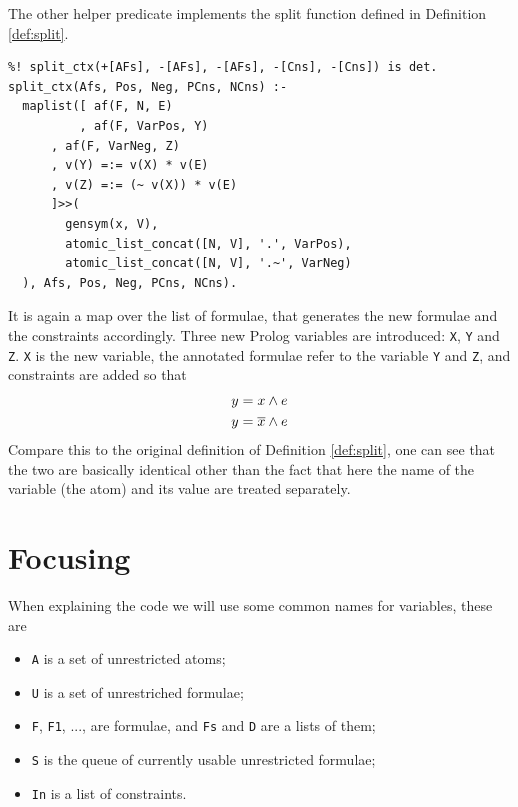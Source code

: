 \documentclass[a4paper, 12pt, tesi, english]{report}
\begin{document}
The other helper predicate implements the split function defined in Definition \ref{def:split}.
\begin{verbatim}
%! split_ctx(+[AFs], -[AFs], -[AFs], -[Cns], -[Cns]) is det.
split_ctx(Afs, Pos, Neg, PCns, NCns) :-
  maplist([ af(F, N, E)
          , af(F, VarPos, Y)
  	  , af(F, VarNeg, Z)
  	  , v(Y) =:= v(X) * v(E)
  	  , v(Z) =:= (~ v(X)) * v(E)
  	  ]>>(
  	    gensym(x, V),
  	    atomic_list_concat([N, V], '.', VarPos),
  	    atomic_list_concat([N, V], '.~', VarNeg)
  ), Afs, Pos, Neg, PCns, NCns).
\end{verbatim}
It is again a map over the list of formulae, that generates the new formulae and the constraints accordingly.
Three new Prolog variables are introduced: \texttt{X}, \texttt{Y} and \texttt{Z}.
\texttt{X} is the new variable, the annotated formulae refer to the variable \texttt{Y} and \texttt{Z}, and constraints are added so that
\begin{align*}
	y &= x \wedge e \\
	y &= \overline{x} \wedge e \\
\end{align*}
Compare this to the original definition of Definition \ref{def:split}, one can see that the two are basically identical other than the fact that here the name of the variable (the atom) and its value are treated separately.

\section{Focusing}
When explaining the code we will use some common names for variables, these are
\begin{itemize}
	\item \texttt{A} is a set of unrestricted atoms;
	\item \texttt{U} is a set of unrestriched formulae;
	\item \texttt{F}, \texttt{F1}, ..., are formulae, and \texttt{Fs} and \texttt{D} are a lists of them;
	\item \texttt{S} is the queue of currently usable unrestricted formulae;
	\item \texttt{In} is a list of constraints.
\end{itemize}
\end{document}
